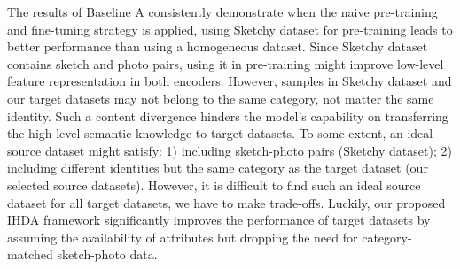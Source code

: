 \documentclass[journal]{IEEEtran}
\begin{document}
\tabcolsep=4pt
\begin{table}[!ht]
\centering
\caption{The source dataset setting and sketch-to-photo retrieval performance on the PKU-Sketch dataset.}
\label{t:results_PKU-Sketch_ablation}
\end{table}

The results of Baseline A consistently demonstrate when the naive pre-training and fine-tuning strategy is applied, using Sketchy dataset for pre-training leads to better performance than using a homogeneous dataset. Since Sketchy dataset contains sketch and photo pairs, using it in pre-training might improve low-level feature representation in both encoders. However, samples in Sketchy dataset and our target datasets may not belong to the same category, not matter the same identity. Such a content divergence hinders the model's capability on transferring the high-level semantic knowledge to target datasets. To some extent, an ideal source dataset might satisfy: 1) including sketch-photo pairs (Sketchy dataset); 2) including different identities but the same category as the target dataset (our selected source datasets). However, it is difficult to find such an ideal source dataset for all target datasets, we have to make trade-offs. Luckily, our proposed IHDA framework significantly improves the performance of target datasets by assuming the availability of attributes but dropping the need for category-matched sketch-photo data.
\end{document}
